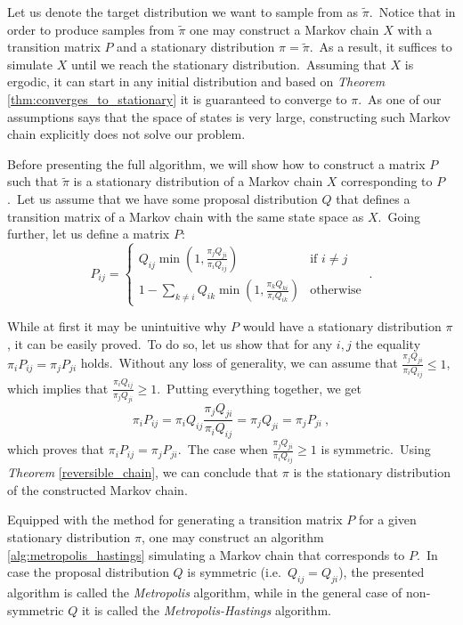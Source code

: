 \documentclass[shortabstract, english, lic]{iithesis}
\theoremstyle{default_theorem_style}\newtheorem{theorem}{Theorem}
\theoremstyle{default_theorem_style}\newtheorem{definition}{Definition}
\begin{document}
Let us denote the target distribution we want to sample from as $\tilde{\pi}$.\ Notice that in order to produce samples
from $\tilde{\pi}$ one may construct a Markov chain $X$ with a transition matrix $P$ and a stationary distribution
$\pi = \tilde{\pi}$.\ As a result, it suffices to simulate $X$ until we reach the stationary distribution.\ Assuming
that $X$ is ergodic, it can start in any initial distribution and based on \textit{Theorem} \ref{thm:converges_to_stationary}
it is guaranteed to converge to $\pi$.\ As one of our assumptions says that the space of states is very large,
constructing such Markov chain explicitly does not solve our problem.\newline

\noindent Before presenting the full algorithm, we will show how to construct a matrix $P$ such that $\tilde{\pi}$ is a
stationary distribution of a Markov chain $X$ corresponding to $P$.\ Let us assume that we have some proposal
distribution $Q$ that defines a transition matrix of a Markov chain with the same state space as $X$.\ Going further,
let us define a matrix $P$:\newline
$$
P_{ij} =
\begin{cases}
  Q_{ij}\min{(1, \frac{\pi_j Q_{ji}}{\pi_i Q_{ij}})} &\text{if $i \ne j$}\\
  1 - \sum\limits_{k \ne i}Q_{ik} \min{(1, \frac{\pi_k Q_{ki}}{\pi_i Q_{ik}})} &\text{otherwise}
\end{cases}\ .
$$

\noindent While at first it may be unintuitive why $P$ would have a stationary distribution $\pi$, it can be easily
proved.\ To do so, let us show that for any $i, j$ the equality $\pi_i P_{ij} = \pi_j P_{ji}$ holds.\ Without
any loss of generality, we can assume that $\frac{\pi_j Q_{ji}}{\pi_i Q_{ij}} \leq 1$, which implies that
$\frac{\pi_i Q_{ij}}{\pi_j Q_{ji}} \geq 1$.\ Putting everything together, we get
$$
\pi_i P_{ij} = \pi_i Q_{ij} \frac{\pi_j Q_{ji}}{\pi_i Q_{ij}} = \pi_j Q_{ji} = \pi_j P_{ji}\ ,
$$
which proves that $\pi_i P_{ij} = \pi_j P_{ji}$.\ The case when $\frac{\pi_j Q_{ji}}{\pi_i Q_{ij}} \geq 1$ is
symmetric.\ Using \textit{Theorem} \ref{reversible_chain}, we can conclude that $\pi$ is the stationary distribution
of the constructed Markov chain.\newline

\noindent Equipped with the method for generating a transition matrix $P$ for a given stationary distribution $\pi$,
one may construct an algorithm \ref{alg:metropolis_hastings} simulating a Markov chain that corresponds to $P$.\ In
case the proposal distribution $Q$ is symmetric (i.e.\ $Q_{ij} = Q_{ji}$), the presented algorithm is called the
\textit{Metropolis} algorithm, while in the general case of non-symmetric $Q$ it is called the
\textit{Metropolis-Hastings} algorithm.
\end{document}
